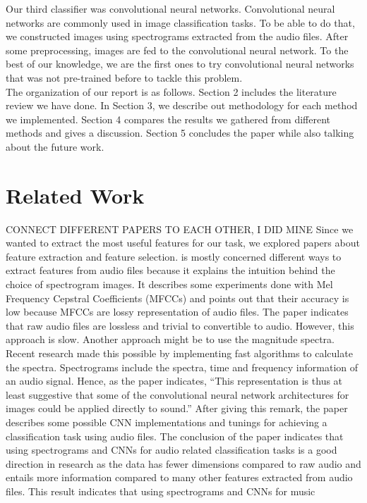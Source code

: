 \documentclass[acmtog, authorversion]{acmart}
\begin{document}
Our third classifier was convolutional neural networks. Convolutional neural networks are commonly used in image classification tasks. To be able to do that, 
we constructed images using spectrograms extracted from the audio files. After some preprocessing, images are fed to the convolutional neural network. 
To the best of our knowledge, we are the first ones to try convolutional neural networks that was not pre-trained before to tackle this problem.\\
The organization of our report is as follows. Section 2 includes the literature review we have done. In Section 3, we describe out methodology for each method
we implemented. Section 4 compares the results we gathered from different methods and gives a discussion. Section 5 concludes the paper while also talking about
the future work.
\section{Related Work}
CONNECT DIFFERENT PAPERS TO EACH OTHER, I DID MINE
Since we wanted to extract the most useful features for our task, we explored papers about feature extraction and feature selection. \cite{wyse2017audio} 
is mostly concerned different ways to extract features from audio files because it explains the intuition behind the choice of spectrogram images. 
It describes some experiments done with Mel Frequency Cepstral Coefficients (MFCCs) and points out that their accuracy is low because MFCCs are lossy 
representation of audio files. The paper indicates that raw audio files are lossless and trivial to convertible to audio. However, this approach is slow. 
Another approach might be to use the magnitude spectra. Recent research made this possible by implementing fast algorithms to calculate the spectra. 
Spectrograms include the spectra, time and frequency information of an audio signal. Hence, as the paper indicates, “This representation is thus at least 
suggestive that some of the convolutional neural network architectures for images could be applied directly to sound.” After giving this remark, the paper 
describes some possible CNN implementations and tunings for achieving a classification task using audio files. The conclusion of the paper indicates that 
using spectrograms and CNNs for audio related classification tasks is a good direction in research as the data has fewer dimensions compared to raw audio 
and entails more information compared to many other features extracted from audio files. This result indicates that using spectrograms and CNNs for music 
\end{document}

